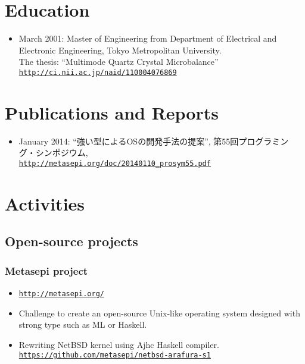 \documentclass[letterpaper]{article}
\begin{document}
\section*{Education}

\begin{itemize}
  \item March 2001: Master of Engineering from Department of Electrical and Electronic Engineering, Tokyo Metropolitan University. \\
    The thesis: ``Multimode Quartz Crystal Microbalance''
    \href{http://ci.nii.ac.jp/naid/110004076869}{\tt http://ci.nii.ac.jp/naid/110004076869}
\end{itemize}

\section*{Publications and Reports}

\begin{itemize}
  \item January 2014: ``強い型によるOSの開発手法の提案'', 第55回プログラミング・シンポジウム, \\
    \href{http://metasepi.org/doc/20140110\_prosym55.pdf}{\tt http://metasepi.org/doc/20140110\_prosym55.pdf}
\end{itemize}

\section*{Activities}

\subsection*{Open-source projects}

\subsubsection*{Metasepi project}
\begin{itemize}
\item \href{http://metasepi.org/}{\tt http://metasepi.org/}
\item Challenge to create an open-source Unix-like operating system designed with strong type such as ML or Haskell.
\item Rewriting NetBSD kernel using Ajhc Haskell compiler. \href{https://github.com/metasepi/netbsd-arafura-s1}{\tt https://github.com/metasepi/netbsd-arafura-s1}
\end{itemize}
\end{document}
